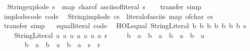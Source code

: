 \begin{isabellebody}
\ \ {\isachardoublequoteopen}String{\isachardot}{\kern0pt}explode\ s\ {\isacharequal}{\kern0pt}\ map\ char{\isacharunderscore}{\kern0pt}of\ {\isacharparenleft}{\kern0pt}asciis{\isacharunderscore}{\kern0pt}of{\isacharunderscore}{\kern0pt}literal\ s{\isacharparenright}{\kern0pt}{\isachardoublequoteclose}\isanewline
%
\isadelimproof
\ \ %
\endisadelimproof
%
\isatagproof
{}\isamarkupfalse%
\ transfer\ simp\isanewline
\isanewline
{}%
\endisatagproof
{\isafoldproof}%
%
\isadelimproof
%
\endisadelimproof
\ \isamarkupfalse%
\ implode{\isacharunderscore}{\kern0pt}code\ {\isacharbrackleft}{\kern0pt}code{\isacharbrackright}{\kern0pt}{\isacharcolon}{\kern0pt}\isanewline
\ \ {\isachardoublequoteopen}String{\isachardot}{\kern0pt}implode\ cs\ {\isacharequal}{\kern0pt}\ literal{\isacharunderscore}{\kern0pt}of{\isacharunderscore}{\kern0pt}asciis\ {\isacharparenleft}{\kern0pt}map\ of{\isacharunderscore}{\kern0pt}char\ cs{\isacharparenright}{\kern0pt}{\isachardoublequoteclose}\isanewline
%
\isadelimproof
\ \ %
\endisadelimproof
%
\isatagproof
{}\isamarkupfalse%
\ transfer\ simp\isanewline
\isanewline
{}%
\endisatagproof
{\isafoldproof}%
%
\isadelimproof
%
\endisadelimproof
\ \isamarkupfalse%
\ equal{\isacharunderscore}{\kern0pt}literal\ {\isacharbrackleft}{\kern0pt}code{\isacharbrackright}{\kern0pt}{\isacharcolon}{\kern0pt}\isanewline
\ \ {\isachardoublequoteopen}HOL{\isachardot}{\kern0pt}equal\ {\isacharparenleft}{\kern0pt}String{\isachardot}{\kern0pt}Literal\ b{}\ b{}\ b{}\ b{}\ b{}\ b{}\ b{}\ s{\isacharparenright}{\kern0pt}\isanewline
\ \ \ \ {\isacharparenleft}{\kern0pt}String{\isachardot}{\kern0pt}Literal\ a{}\ a{}\ a{}\ a{}\ a{}\ a{}\ a{}\ r{\isacharparenright}{\kern0pt}\isanewline
\ \ \ \ {\isasymlongleftrightarrow}\ {\isacharparenleft}{\kern0pt}b{}\ {\isasymlongleftrightarrow}\ a{}{\isacharparenright}{\kern0pt}\ {\isasymand}\ {\isacharparenleft}{\kern0pt}b{}\ {\isasymlongleftrightarrow}\ a{}{\isacharparenright}{\kern0pt}\ {\isasymand}\ {\isacharparenleft}{\kern0pt}b{}\ {\isasymlongleftrightarrow}\ a{}{\isacharparenright}{\kern0pt}\ {\isasymand}\ {\isacharparenleft}{\kern0pt}b{}\ {\isasymlongleftrightarrow}\ a{}{\isacharparenright}{\kern0pt}\isanewline
\ \ \ \ \ \ {\isasymand}\ {\isacharparenleft}{\kern0pt}b{}\ {\isasymlongleftrightarrow}\ a{}{\isacharparenright}{\kern0pt}\ {\isasymand}\ {\isacharparenleft}{\kern0pt}b{}\ {\isasymlongleftrightarrow}\ a{}{\isacharparenright}{\kern0pt}\ {\isasymand}\ {\isacharparenleft}{\kern0pt}b{}\ {\isasymlongleftrightarrow}\ a{}{\isacharparenright}{\kern0pt}\ {\isasymand}\ {\isacharparenleft}{\kern0pt}s\ {\isacharequal}{\kern0pt}\ r{\isacharparenright}{\kern0pt}{\isachardoublequoteclose}\isanewline

\end{isabellebody}
